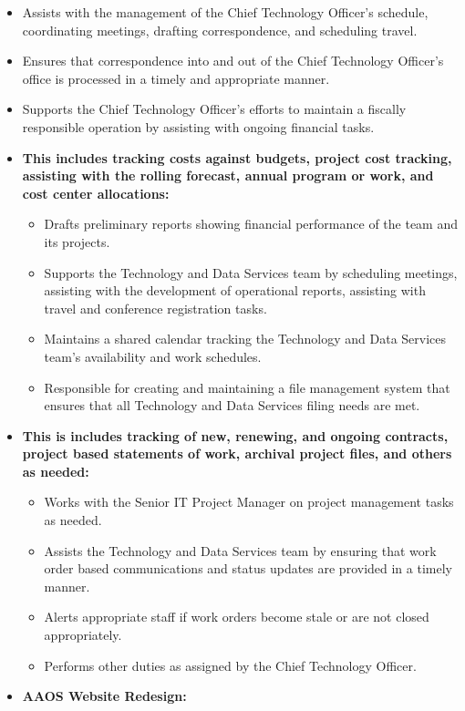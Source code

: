 \documentclass[a4papper,overlapped,line]{res}
\begin{document}
\begin{resume}
\begin{itemize}
	\item Assists with the management of the Chief Technology Officer’s schedule, coordinating meetings, drafting correspondence, and scheduling travel.
	\item Ensures that correspondence into and out of the Chief Technology Officer’s office is processed in a timely and appropriate manner.
	\item Supports the Chief Technology Officer’s efforts to maintain a fiscally responsible operation by assisting with ongoing financial tasks.
	\item \textbf{This includes tracking costs against budgets, project cost tracking, assisting with the rolling forecast, annual program or work, and cost center allocations:}
\begin{itemize}
	\item Drafts preliminary reports showing financial performance of the team and its projects. 
	\item Supports the Technology and Data Services team by scheduling meetings, assisting with the development of operational reports, assisting with travel and conference registration tasks.
	\item Maintains a shared calendar tracking the Technology and Data Services team’s availability and work schedules. 
	\item Responsible for creating and maintaining a file management system that ensures that all Technology and Data Services filing needs are met.
\end{itemize} 
	\item \textbf{This  is includes tracking of new, renewing, and ongoing contracts, project based statements of work, archival project files, and others as needed:}
\begin{itemize}
	\item Works with the Senior IT Project Manager on project management tasks as needed. 
	\item Assists the Technology and Data Services team by ensuring that work order based communications and status updates are provided in a timely manner. 
	\item Alerts appropriate staff if work orders become stale or are not closed appropriately.
	\item Performs other duties as assigned by the Chief Technology Officer.
\end{itemize}
	\item \textbf{AAOS Website Redesign:}
\begin{itemize}

\end{itemize}
\end{itemize}
\end{resume}
\end{document}
